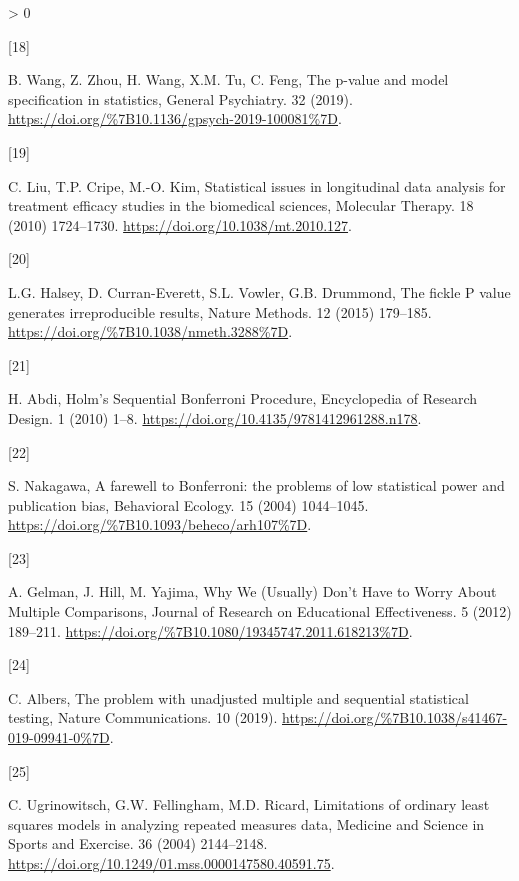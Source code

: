 \documentclass[
]{article}
\newlength{\cslhangindent}
\newlength{\csllabelwidth}
\newenvironment{CSLReferences}[2] %
 {%
  \setlength{\parindent}{0pt}
  \ifodd #1 \everypar{\setlength{\hangindent}{\cslhangindent}}\ignorespaces\fi
  \ifnum #2 > 0
  \setlength{\parskip}{#2\baselineskip}
  \fi
 }%
 {}
\newcommand{\CSLLeftMargin}[1]{\parbox[t]{\csllabelwidth}{#1}}
\newcommand{\CSLRightInline}[1]{\parbox[t]{\linewidth - \csllabelwidth}{#1}\break}
\begin{document}
\begin{CSLReferences}{0}{0}
\leavevmode\hypertarget{ref-wang2019}{}%
\CSLLeftMargin{{[}18{]} }
\CSLRightInline{B. Wang, Z. Zhou, H. Wang, X.M. Tu, C. Feng, {The p-value and model specification in statistics}, {General Psychiatry}. {32} (2019). \url{https://doi.org/\%7B10.1136/gpsych-2019-100081\%7D}.}

\leavevmode\hypertarget{ref-liu2010}{}%
\CSLLeftMargin{{[}19{]} }
\CSLRightInline{C. Liu, T.P. Cripe, M.-O. Kim, Statistical issues in longitudinal data analysis for treatment efficacy studies in the biomedical sciences, Molecular Therapy. 18 (2010) 1724--1730. \url{https://doi.org/10.1038/mt.2010.127}.}

\leavevmode\hypertarget{ref-halsey2015}{}%
\CSLLeftMargin{{[}20{]} }
\CSLRightInline{L.G. Halsey, D. Curran-Everett, S.L. Vowler, G.B. Drummond, {The fickle P value generates irreproducible results}, {Nature Methods}. {12} (2015) 179--185. \url{https://doi.org/\%7B10.1038/nmeth.3288\%7D}.}

\leavevmode\hypertarget{ref-abdi2010}{}%
\CSLLeftMargin{{[}21{]} }
\CSLRightInline{H. Abdi, {Holm's Sequential Bonferroni Procedure}, Encyclopedia of Research Design. 1 (2010) 1--8. \url{https://doi.org/10.4135/9781412961288.n178}.}

\leavevmode\hypertarget{ref-nakagawa2004}{}%
\CSLLeftMargin{{[}22{]} }
\CSLRightInline{S. Nakagawa, {A farewell to Bonferroni: the problems of low statistical power and publication bias}, {Behavioral Ecology}. {15} (2004) 1044--1045. \url{https://doi.org/\%7B10.1093/beheco/arh107\%7D}.}

\leavevmode\hypertarget{ref-gelman2012}{}%
\CSLLeftMargin{{[}23{]} }
\CSLRightInline{A. Gelman, J. Hill, M. Yajima, {Why We (Usually) Don't Have to Worry About Multiple Comparisons}, {Journal of Research on Educational Effectiveness}. {5} (2012) 189--211. \url{https://doi.org/\%7B10.1080/19345747.2011.618213\%7D}.}

\leavevmode\hypertarget{ref-albers2019}{}%
\CSLLeftMargin{{[}24{]} }
\CSLRightInline{C. Albers, {The problem with unadjusted multiple and sequential statistical testing}, {Nature Communications}. {10} (2019). \url{https://doi.org/\%7B10.1038/s41467-019-09941-0\%7D}.}

\leavevmode\hypertarget{ref-ugrinowitsch2004}{}%
\CSLLeftMargin{{[}25{]} }
\CSLRightInline{C. Ugrinowitsch, G.W. Fellingham, M.D. Ricard, Limitations of ordinary least squares models in analyzing repeated measures data, Medicine and Science in Sports and Exercise. 36 (2004) 2144--2148. \url{https://doi.org/10.1249/01.mss.0000147580.40591.75}.}


\end{CSLReferences}
\end{document}
